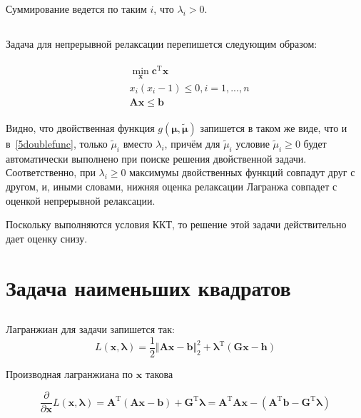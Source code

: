 	Суммирование ведется по таким $i$, что $\lambda_i > 0$.
	

	\subsection{}
	
	Задача для непрерывной релаксации перепишется следующим образом:
	
	\begin{align}
	\begin{aligned}
	&\min_{\mathbf{x}} \mathbf{c}^{\text{T}}\mathbf{x} \\
	&x_i(x_i-1) \leqslant 0, i= 1,...,n\\
	&\mathbf{A}\mathbf{x} \leqslant \mathbf{b}
	\end{aligned}
	\end{align}
	
	Видно, что двойственная функция $g(\boldsymbol{\mu},\boldsymbol{\tilde{\mu}})$ запишется в таком же виде, что и в~\eqref{5doublefunc}, только $\tilde{\mu}_i$ вместо $\lambda_i$, причём для $\tilde{\mu}_i$ условие $\tilde{\mu}_i \geqslant 0$ будет автоматически выполнено при поиске решения двойственной задачи. Соответственно, при $\lambda_i \geqslant 0$ максимумы двойственных функций совпадут друг с другом, и, иными словами, нижняя оценка релаксации Лагранжа совпадет с оценкой непрерывной релаксации.
	
	Поскольку выполняются условия ККТ, то решение этой задачи действительно дает оценку снизу.
	
	
	
	\section{Задача наименьших квадратов}
	
	\subsection{}
	Лагранжиан для задачи запишется так:
	\begin{equation}
	L(\mathbf{x},\boldsymbol{\lambda}) = \frac 12 \Vert \mathbf{A}\mathbf{x}-\mathbf{b} \Vert_2^2 +\boldsymbol{\lambda}^{\text{T}} (\mathbf{G}\mathbf{x}-\textbf{h}) 
	\end{equation}
	
	Производная лагранжиана по $\mathbf{x}$ такова 
	
	\begin{equation}
	\frac{\partial}{\partial \mathbf{x}}L(\mathbf{x},\boldsymbol{\lambda}) = \mathbf{A}^{\text{T}}(\mathbf{A}\mathbf{x}-\mathbf{b}) +\mathbf{G}^{\text{T}}\boldsymbol{\lambda} = \mathbf{A}^{\text{T}}\mathbf{A}\mathbf{x}-(\mathbf{A}^{\text{T}}\mathbf{b} -\mathbf{G}^{\text{T}}\boldsymbol{\lambda})
	\end{equation}
	
